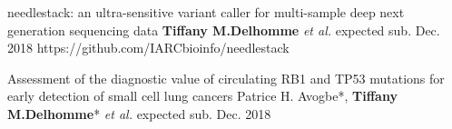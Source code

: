 \begin{cventries}

	\cvpublicationentry
    {} %
    {needlestack: an ultra-sensitive variant caller for multi-sample deep next generation sequencing data} %
    {\textbf{Tiffany M.Delhomme} \textit{et al.}} %
    {}
    {expected sub. Dec. 2018} %
    {https://github.com/IARCbioinfo/needlestack}
    
    \cvpublicationentry
    {} %
    {Assessment of the diagnostic value of circulating RB1 and
TP53 mutations for early detection of small cell lung cancers} %
    {Patrice H. Avogbe*, \textbf{Tiffany M.Delhomme}* \textit{et al.}} %
    {}
    {expected sub. Dec. 2018} %
    {}
\end{cventries}
